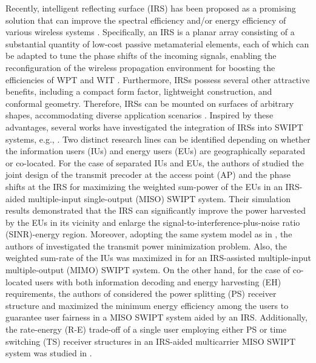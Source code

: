 \documentclass[12pt,draftclsnofoot, onecolumn]{IEEEtran}
\theoremstyle{plain}
\begin{document}
\begin{sloppypar}
Recently, intelligent reflecting surface (IRS) has been proposed as a promising solution that can improve the spectral efficiency and/or energy efficiency of various wireless systems \cite{2020_Qingqing_IRS_Intro}. Specifically, an IRS is a planar array consisting of a substantial quantity of low-cost passive metamaterial elements, each of which can be adapted to tune the phase shifts of the incoming signals, enabling the reconfiguration of the wireless propagation environment for boosting the efficiencies of WPT and WIT \cite{2019_Qingqing_Joint,2022_Qingqing_WEIT_overview,2022_Qingqing_WPCN}. Furthermore, IRSs possess several other attractive benefits, including a compact form factor, lightweight construction, and conformal geometry. Therefore, IRSs can be mounted on surfaces of arbitrary shapes, accommodating diverse application scenarios \cite{2019_Marco_intro}. Inspired by these advantages, several works have investigated the integration of IRSs into SWIPT systems, e.g., \cite{2020_Qingqing_SWIPT_letter,2020_Qingqing_SWIPT_QoS,2020_Cunhua_SWIPT,2020_Wei_SWIPT_secure,2021_Shayan_SWIPT,2022_Yang_SWIPT,2023_Ying_IFC}. Two distinct research lines can be identified depending on whether the information users (IUs) and energy users (EUs) are geographically separated or co-located. For the case of separated IUs and EUs, the authors of \cite{2020_Qingqing_SWIPT_letter} studied the joint design of the transmit precoder at the access point (AP) and the phase shifts at the IRS for maximizing the weighted sum-power of the EUs in an IRS-aided multiple-input single-output (MISO) SWIPT system. Their simulation results demonstrated that the IRS can significantly improve the power harvested by the EUs in its vicinity and enlarge the signal-to-interference-plus-noise ratio (SINR)-energy region. Moreover, adopting the same system model as in \cite{2020_Qingqing_SWIPT_letter}, the authors of \cite{2020_Qingqing_SWIPT_QoS} investigated the transmit power minimization problem. Also, the weighted sum-rate of the IUs was maximized in \cite{2020_Cunhua_SWIPT} for an IRS-assisted multiple-input multiple-output (MIMO) SWIPT system. 
On the other hand, for the case of co-located users with both information decoding and energy harvesting (EH) requirements, the authors of \cite{2021_Shayan_SWIPT} considered the power splitting (PS) receiver structure and maximized the minimum energy efficiency among the users to guarantee user fairness in a MISO SWIPT system aided by an IRS. Additionally, the rate-energy (R-E) trade-off of a single user employing either PS or time switching (TS) receiver structures in an IRS-aided multicarrier MISO SWIPT system was studied in \cite{2022_Yang_SWIPT}. 


\end{sloppypar}
\end{document}

